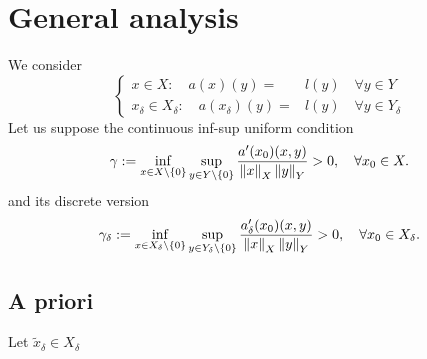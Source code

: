 \documentclass[english,12pt,a4paper]{article}
\begin{document}
\section{General analysis}\label{sec:}
%
We consider 
%
\begin{equation}\label{eq:}
%
\left\{
\begin{aligned}
x\in X:\quad a(x)(y) =& l(y)\quad \forall y \in Y\\
x_{\delta}\in X_{\delta}:\quad a(x_{\delta})(y) =& l(y)\quad \forall y \in Y_{\delta}
\end{aligned}
\right.
\end{equation}
%
Let us suppose the continuous inf-sup uniform condition
%
\begin{equation}\label{eq:abstract_infsup}
\gamma := \inf_{x\in X\setminus\left\{0\right\}}\sup_{y\in Y\setminus\left\{0\right\}} \frac{a'(x_0)(x,y)}{\left\|x\right\|_X\left\|y\right\|_Y}  > 0,\quad \forall x_0\in X.
\end{equation}
%
and its discrete version
%
\begin{equation}\label{eq:abstract_infsup_delta}
\gamma_{\delta} := \inf_{x\in X_{\delta}\setminus\left\{0\right\}}\sup_{y\in Y_{\delta}\setminus\left\{0\right\}} \frac{a_{\delta}'(x_0)(x,y)}{\left\|x\right\|_X\left\|y\right\|_Y}  > 0,\quad \forall x_0\in X_{\delta}.
\end{equation}
%
%
\subsection{A priori}\label{subsec:}
%
Let $\widetilde{x}_{\delta} \in X_{\delta}$

%
\end{document}
